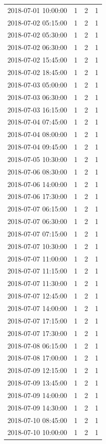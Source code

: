 \begin{tabular}{lrrr}
2018-07-01 10:00:00 & 1 & 2 & 1 \\
2018-07-02 05:15:00 & 1 & 2 & 1 \\
2018-07-02 05:30:00 & 1 & 2 & 1 \\
2018-07-02 06:30:00 & 1 & 2 & 1 \\
2018-07-02 15:45:00 & 1 & 2 & 1 \\
2018-07-02 18:45:00 & 1 & 2 & 1 \\
2018-07-03 05:00:00 & 1 & 2 & 1 \\
2018-07-03 06:30:00 & 1 & 2 & 1 \\
2018-07-03 16:15:00 & 1 & 2 & 1 \\
2018-07-04 07:45:00 & 1 & 2 & 1 \\
2018-07-04 08:00:00 & 1 & 2 & 1 \\
2018-07-04 09:45:00 & 1 & 2 & 1 \\
2018-07-05 10:30:00 & 1 & 2 & 1 \\
2018-07-06 08:30:00 & 1 & 2 & 1 \\
2018-07-06 14:00:00 & 1 & 2 & 1 \\
2018-07-06 17:30:00 & 1 & 2 & 1 \\
2018-07-07 06:15:00 & 1 & 2 & 1 \\
2018-07-07 06:30:00 & 1 & 2 & 1 \\
2018-07-07 07:15:00 & 1 & 2 & 1 \\
2018-07-07 10:30:00 & 1 & 2 & 1 \\
2018-07-07 11:00:00 & 1 & 2 & 1 \\
2018-07-07 11:15:00 & 1 & 2 & 1 \\
2018-07-07 11:30:00 & 1 & 2 & 1 \\
2018-07-07 12:45:00 & 1 & 2 & 1 \\
2018-07-07 14:00:00 & 1 & 2 & 1 \\
2018-07-07 17:15:00 & 1 & 2 & 1 \\
2018-07-07 17:30:00 & 1 & 2 & 1 \\
2018-07-08 06:15:00 & 1 & 2 & 1 \\
2018-07-08 17:00:00 & 1 & 2 & 1 \\
2018-07-09 12:15:00 & 1 & 2 & 1 \\
2018-07-09 13:45:00 & 1 & 2 & 1 \\
2018-07-09 14:00:00 & 1 & 2 & 1 \\
2018-07-09 14:30:00 & 1 & 2 & 1 \\
2018-07-10 08:45:00 & 1 & 2 & 1 \\
2018-07-10 10:00:00 & 1 & 2 & 1 \\

\end{tabular}
